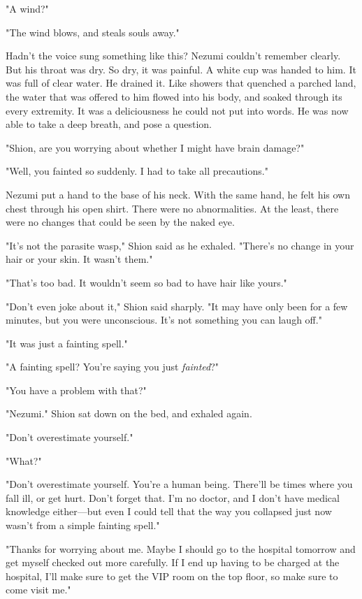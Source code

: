 "A wind?"

"The wind blows, and steals souls away."


Hadn't the voice sung something like this? Nezumi couldn't remember
clearly. But his throat was dry. So dry, it was painful. A white cup was
handed to him. It was full of clear water. He drained it. Like showers
that quenched a parched land, the water that was offered to him flowed
into his body, and soaked through its every extremity. It was a
deliciousness he could not put into words. He was now able to take a
deep breath, and pose a question.

"Shion, are you worrying about whether I might have brain damage?"

"Well, you fainted so suddenly. I had to take all precautions."

Nezumi put a hand to the base of his neck. With the same hand, he felt
his own chest through his open shirt. There were no abnormalities. At
the least, there were no changes that could be seen by the naked eye.

"It's not the parasite wasp," Shion said as he exhaled. "There's no
change in your hair or your skin. It wasn't them."

"That's too bad. It wouldn't seem so bad to have hair like yours."

"Don't even joke about it," Shion said sharply. "It may have only been
for a few minutes, but you were unconscious. It's not something you can
laugh off."

"It was just a fainting spell."

"A fainting spell? You're saying you just \emph{fainted}?"

"You have a problem with that?"

"Nezumi." Shion sat down on the bed, and exhaled again.

"Don't overestimate yourself."

"What?"

"Don't overestimate yourself. You're a human being. There'll be times
where you fall ill, or get hurt. Don't forget that. I'm no doctor, and I
don't have medical knowledge either---but even I could tell that the way
you collapsed just now wasn't from a simple fainting spell."

"Thanks for worrying about me. Maybe I should go to the hospital
tomorrow and get myself checked out more carefully. If I end up having
to be charged at the hospital, I'll make sure to get the VIP room on the
top floor, so make sure to come visit me."

